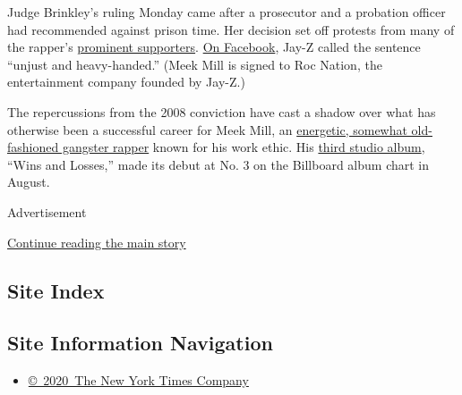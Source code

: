 Judge Brinkley's ruling Monday came after a prosecutor and a probation
officer had recommended against prison time. Her decision set off
protests from many of the rapper's
\href{http://www.billboard.com/articles/columns/hip-hop/8023318/meek-mill-prison-sentence-reaction-social-media}{prominent
supporters}.
\href{https://www.facebookcorewwwi.onion/JayZ/posts/10156145799644206}{On
Facebook}, Jay-Z called the sentence ``unjust and heavy-handed.'' (Meek
Mill is signed to Roc Nation, the entertainment company founded by
Jay-Z.)

The repercussions from the 2008 conviction have cast a shadow over what
has otherwise been a successful career for Meek Mill, an
\href{https://www.nytimes3xbfgragh.onion/2015/07/06/arts/music/meek-mill-is-loudly-reflective-on-his-second-album-dreams-worth-more-than-money.html}{energetic,
somewhat old-fashioned gangster rapper} known for his work ethic. His
\href{http://www.billboard.com/articles/columns/chart-beat/7882489/lana-del-rey-lust-for-life-no-1-billboard-200-albums}{third
studio album}, ``Wins and Losses,'' made its debut at No. 3 on the
Billboard album chart in August.

Advertisement

\protect\hyperlink{after-bottom}{Continue reading the main story}

\hypertarget{site-index}{%
\subsection{Site Index}\label{site-index}}

\hypertarget{site-information-navigation}{%
\subsection{Site Information
Navigation}\label{site-information-navigation}}

\begin{itemize}
\tightlist
\item
  \href{https://help.nytimes3xbfgragh.onion/hc/en-us/articles/115014792127-Copyright-notice}{©~2020~The
  New York Times Company}
\end{itemize}

